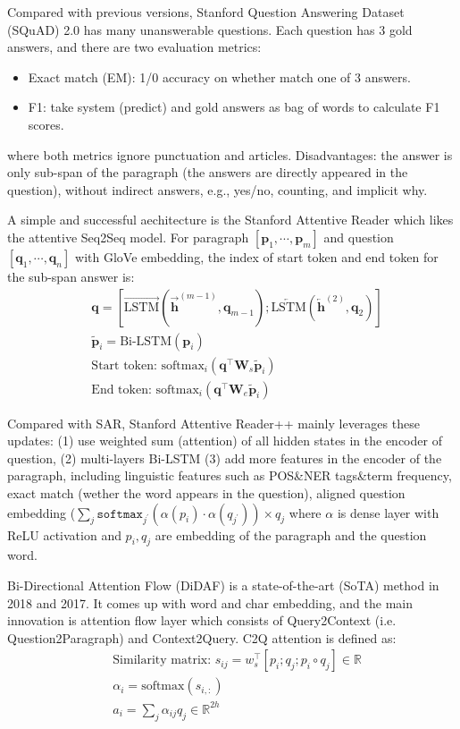 Compared with previous versions, Stanford Question Answering Dataset (SQuAD) 2.0 has many unanswerable questions.
Each question has 3 gold answers, and there are two evaluation metrics:
\begin{itemize}
	\item Exact match (EM): 1/0 accuracy on whether match one of 3 answers.
	\item F1: take system (predict) and gold answers as bag of words to calculate F1 scores.
\end{itemize}
where both metrics ignore punctuation and articles.
Disadvantages:  the answer is only sub-span of the paragraph (the answers are directly appeared in the question), without indirect answers, e.g., yes/no, counting, and implicit why.

A simple and successful aechitecture is the Stanford Attentive Reader  which likes the attentive Seq2Seq model.
For paragraph $[\bm{p}_1, \cdots, \bm{p}_m]$ and question $[\bm{q}_1, \cdots, \bm{q}_n]$ with GloVe embedding, the index of start token and end token for the sub-span answer is:
\begin{align}
&\bm{q} = [\overrightarrow{\text{LSTM}}(\overrightarrow{\bm{h}}^{(m-1)}, \bm{q}_{m-1}); \overleftarrow{\text{LSTM}}(\overleftarrow{\bm{h}}^{(2)}, \bm{q}_{2})] \nonumber \\
&\tilde{\bm{p}}_i = \text{Bi-LSTM}(\bm{p}_i) \nonumber \\
&\text{Start token: } \text{softmax}_i (\bm{q}^\top \bm{W}_s \tilde{\bm{p}}_i) \nonumber \\
&\text{End token: } \text{softmax}_i (\bm{q}^\top \bm{W}_e \tilde{\bm{p}}_i) \nonumber
\end{align}

Compared with SAR, Stanford Attentive Reader++  mainly leverages these updates: (1) use weighted sum (attention) of all hidden states in the encoder of question, (2) multi-layers Bi-LSTM (3) add more features in the encoder of the paragraph, including linguistic features such as POS\&NER tags\&term frequency, exact match (wether the word appears in the question), aligned question embedding ($\sum_j \texttt{softmax}_{j^\prime}(\alpha(p_i) \cdot \alpha(q_{j^\prime})) \times q_j$ where $\alpha$ is dense layer with ReLU activation and $p_i, q_j$ are embedding of the paragraph and the question word.

Bi-Directional Attention Flow (DiDAF)  is a state-of-the-art (SoTA) method in 2018 and 2017.
It comes up with word and char embedding, and the main innovation is attention flow layer which consists of Query2Context (i.e. Question2Paragraph) and Context2Query.
C2Q attention is defined as:
\begin{align}
&\text{Similarity matrix: } s_{ij} = w_s^\top [p_i; q_j; p_i \circ q_j] \in \mathbb{R} \\
&\alpha_i = \text{softmax}(s_{i,:}) \\
&a_i = \sum_j \alpha_{ij} q_j \in \mathbb{R}^{2h} 
\end{align}

